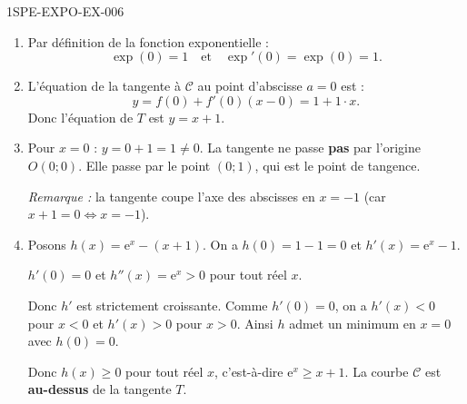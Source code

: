 \begin{corrige}{1SPE-EXPO-EX-006}
\begin{enumerate}
\item Par définition de la fonction exponentielle :
\[\exp(0) = 1 \quad \text{et} \quad \exp'(0) = \exp(0) = 1.\]

\item L'équation de la tangente à $\mathcal{C}$ au point d'abscisse $a = 0$ est :
\[y = f(0) + f'(0)(x - 0) = 1 + 1 \cdot x.\]
Donc l'équation de $T$ est $y = x + 1$.

\item Pour $x = 0$ : $y = 0 + 1 = 1
\neq 0$. La tangente ne passe \textbf{pas} par l'origine $O(0 ; 0)$. Elle passe par le point $(0 ; 1)$, qui est le point de tangence.

\emph{Remarque :} la tangente coupe l'axe des abscisses en $x = -1$ (car $x + 1 = 0 \Leftrightarrow x = -1$).

\item Posons $h(x) = \mathrm{e}^x - (x + 1)$. On a $h(0) = 1 - 1 = 0$ et $h'(x) = \mathrm{e}^x - 1$.

$h'(0) = 0$ et $h''(x) = \mathrm{e}^x > 0$ pour tout réel $x$.

Donc $h'$ est strictement croissante. Comme $h'(0) = 0$, on a $h'(x) < 0$ pour $x < 0$ et $h'(x) > 0$ pour $x > 0$. Ainsi $h$ admet un minimum en $x = 0$ avec $h(0) = 0$.

Donc $h(x) \geqslant 0$ pour tout réel $x$, c'est-à-dire $\mathrm{e}^x \geqslant x + 1$. La courbe $\mathcal{C}$ est \textbf{au-dessus} de la tangente $T$.
\end{enumerate}
\end{corrige}
